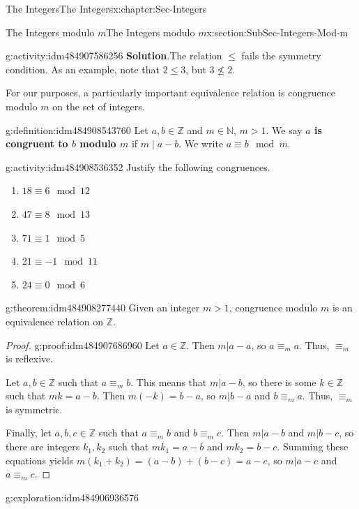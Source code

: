 \documentclass[oneside,10pt,]{book}
\newcommand{\blocktitlefont}{\relax}
\newcommand{\terminology}[1]{\textbf{#1}}
\numberwithin{equation}{section}
\renewcommand{\le}{\leqslant}
\def\Z{{\mathbb Z}}
\def\N{{\mathbb N}}
\begin{document}
\begin{chapterptx}{The Integers}{}{The Integers}{}{}{x:chapter:Sec-Integers}
\begin{sectionptx}{The Integers modulo \(m\)}{}{The Integers modulo \(m\)}{}{}{x:section:SubSec-Integers-Mod-m}
\begin{activity}{}{g:activity:idm484907586256}
\noindent\textbf{\blocktitlefont Solution}.\hypertarget{g:solution:idm484908415344}{}\quad{}The relation \(\le\) fails the symmetry condition. As an example, note that \(2 \le 3\), but \(3\not\le 2\).%
\end{activity}
For our purposes, a particularly important equivalence relation is congruence modulo \(m\) on the set of integers.%
\begin{definition}{}{g:definition:idm484908543760}%
%
Let \(a,b\in \Z\) and \(m \in \N\), \(m > 1\). We say \terminology{\(a\) is congruent to \(b\) modulo \(m\)} if \(m\mid a-b\). We write \(a \equiv b\mod m\).%
\end{definition}
\begin{activity}{}{g:activity:idm484908536352}%
Justify the following congruences.%
\begin{enumerate}
\item{}\(\displaystyle 18 \equiv 6\mod 12\)%
\item{}\(\displaystyle 47 \equiv 8\mod 13\)%
\item{}\(\displaystyle 71 \equiv 1\mod 5\)%
\item{}\(\displaystyle 21 \equiv -1 \mod 11\)%
\item{}\(\displaystyle 24 \equiv 0\mod 6\)%
\end{enumerate}
%
\end{activity}
\begin{theorem}{}{}{g:theorem:idm484908277440}%
Given an integer \(m > 1\), congruence modulo \(m\) is an equivalence relation on \(\Z\).%
\end{theorem}
\begin{proof}{}{g:proof:idm484907686960}
Let \(a\in \Z\). Then \(m|a-a\), so \(a \equiv_m a\). Thus, \(\equiv_m\) is reflexive.%
\par
Let \(a,b\in \Z\) such that \(a\equiv_m b\). This means that \(m|a-b\), so there is some \(k\in \Z\) such that \(mk = a-b\). Then \(m(-k) = b-a\), so \(m|b-a\) and \(b \equiv_m a\). Thus, \(\equiv_m\) is symmetric.%
\par
Finally, let \(a,b,c\in \Z\) such that \(a\equiv_m b\) and \(b\equiv_m c\). Then \(m|a-b\) and \(m|b-c\), so there are integers \(k_1, k_2\) such that \(m k_1 = a-b\) and \(m k_2 = b-c\). Summing these equations yields \(m(k_1 + k_2) = (a-b) + (b-c) = a-c\), so \(m|a-c\) and \(a\equiv_m c\).%
\end{proof}
\label{g:notation:idm484908634880}%
\begin{exploration}{}{g:exploration:idm484906936576}%

\end{exploration}
\end{sectionptx}
\end{chapterptx}
\end{document}
